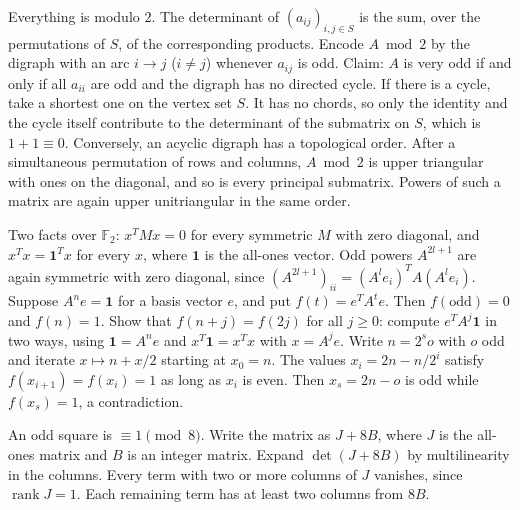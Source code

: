 \documentclass[11pt,a4paper]{article}
\begin{document}
Everything is modulo \(2\). The determinant of \((a_{ij})_{i,j\in S}\) is the sum, over the permutations of \(S\), of the corresponding products. Encode \(A\bmod 2\) by the digraph with an arc \(i\to j\) (\(i\ne j\)) whenever \(a_{ij}\) is odd.
Claim: \(A\) is very odd if and only if all \(a_{ii}\) are odd and the digraph has no directed cycle. If there is a cycle, take a shortest one on the vertex set \(S\). It has no chords, so only the identity and the cycle itself contribute to the determinant of the submatrix on \(S\), which is \(1+1\equiv0\).
Conversely, an acyclic digraph has a topological order. After a simultaneous permutation of rows and columns, \(A\bmod2\) is upper triangular with ones on the diagonal, and so is every principal submatrix. Powers of such a matrix are again upper unitriangular in the same order.

Two facts over \(\mathbb F_2\): \(x^TMx=0\) for every symmetric \(M\) with zero diagonal, and \(x^Tx=\mathbf 1^Tx\) for every \(x\), where \(\mathbf 1\) is the all-ones vector. Odd powers \(A^{2l+1}\) are again symmetric with zero diagonal, since \((A^{2l+1})_{ii}=(A^le_i)^TA(A^le_i)\).
Suppose \(A^ne=\mathbf 1\) for a basis vector \(e\), and put \(f(t)=e^TA^te\). Then \(f(\text{odd})=0\) and \(f(n)=1\). Show that \(f(n+j)=f(2j)\) for all \(j\ge0\): compute \(e^TA^j\mathbf 1\) in two ways, using \(\mathbf 1=A^ne\) and \(x^T\mathbf 1=x^Tx\) with \(x=A^je\).
Write \(n=2^so\) with \(o\) odd and iterate \(x\mapsto n+x/2\) starting at \(x_0=n\). The values \(x_i=2n-n/2^i\) satisfy \(f(x_{i+1})=f(x_i)=1\) as long as \(x_i\) is even. Then \(x_s=2n-o\) is odd while \(f(x_s)=1\), a contradiction.

An odd square is \(\equiv1\pmod 8\). Write the matrix as \(J+8B\), where \(J\) is the all-ones matrix and \(B\) is an integer matrix.
Expand \(\det(J+8B)\) by multilinearity in the columns. Every term with two or more columns of \(J\) vanishes, since \(\operatorname{rank}J=1\). Each remaining term has at least two columns from \(8B\).
\end{document}
